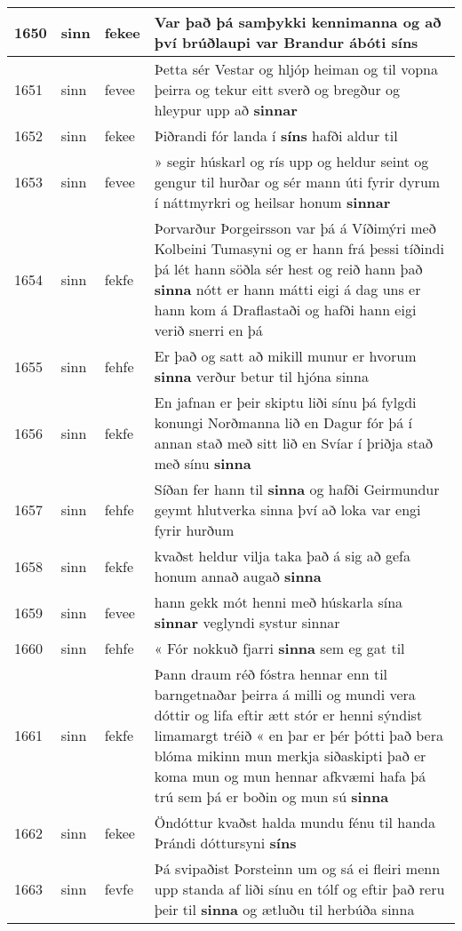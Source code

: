 \documentclass{article}
\begin{document}
\begin{longtable}{p{1cm}|p{1cm}|p{1cm}|p{13cm}}
\hline
1650&sinn&fekee&Var það þá samþykki kennimanna og að því brúðlaupi var Brandur ábóti \textbf{síns} \\
\hline
1651&sinn&fevee&Þetta sér Vestar og hljóp heiman og til vopna þeirra og tekur eitt sverð og bregður og hleypur upp að \textbf{sinnar} \\
\hline
1652&sinn&fekee&Þiðrandi fór landa í \textbf{síns} hafði aldur til\\
\hline
1653&sinn&fevee&» segir húskarl og rís upp og heldur seint og gengur til hurðar og sér mann úti fyrir dyrum í náttmyrkri og heilsar honum \textbf{sinnar} \\
\hline
1654&sinn&fekfe&Þorvarður Þorgeirsson var þá á Víðimýri með Kolbeini Tumasyni og er hann frá þessi tíðindi þá lét hann söðla sér hest og reið hann það \textbf{sinna} nótt er hann mátti eigi á dag uns er hann kom á Draflastaði og hafði hann eigi verið snerri en þá\\
\hline
1655&sinn&fehfe&Er það og satt að mikill munur er hvorum \textbf{sinna} verður betur til hjóna sinna\\
\hline
1656&sinn&fekfe&En jafnan er þeir skiptu liði sínu þá fylgdi konungi Norðmanna lið en Dagur fór þá í annan stað með sitt lið en Svíar í þriðja stað með sínu \textbf{sinna} \\
\hline
1657&sinn&fehfe&Síðan fer hann til \textbf{sinna} og hafði Geirmundur geymt hlutverka sinna því að loka var engi fyrir hurðum\\
\hline
1658&sinn&fekfe&kvaðst heldur vilja taka það á sig að gefa honum annað augað \textbf{sinna} \\
\hline
1659&sinn&fevee&hann gekk mót henni með húskarla sína \textbf{sinnar} veglyndi systur sinnar\\
\hline
1660&sinn&fehfe&« Fór nokkuð fjarri \textbf{sinna} sem eg gat til\\
\hline
1661&sinn&fekfe&Þann draum réð fóstra hennar enn til barngetnaðar þeirra á milli og mundi vera dóttir og lifa eftir ætt stór er henni sýndist limamargt tréið « en þar er þér þótti það bera blóma mikinn mun merkja siðaskipti það er koma mun og mun hennar afkvæmi hafa þá trú sem þá er boðin og mun sú \textbf{sinna} \\
\hline
1662&sinn&fekee&Öndóttur kvaðst halda mundu fénu til handa Þrándi dóttursyni \textbf{síns} \\
\hline
1663&sinn&fevfe&Þá svipaðist Þorsteinn um og sá ei fleiri menn upp standa af liði sínu en tólf og eftir það reru þeir til \textbf{sinna} og ætluðu til herbúða sinna\\

\end{longtable}
\end{document}
